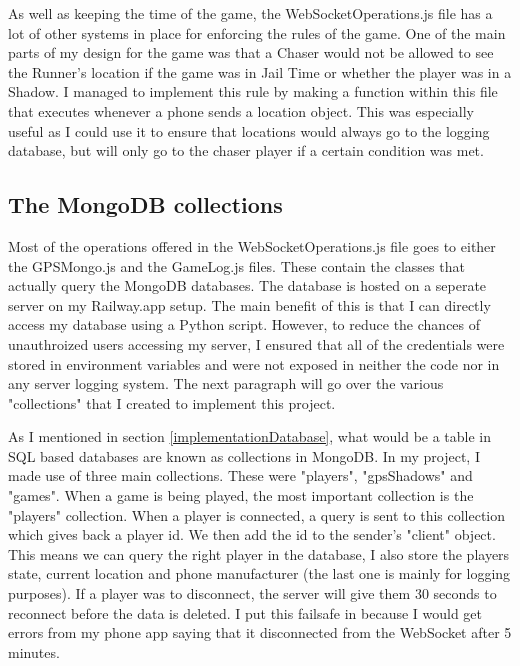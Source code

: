 \documentclass{l4proj}
\begin{document}
As well as keeping the time of the game, the WebSocketOperations.js file has a lot of other systems in place for enforcing the
rules of the game. One of the main parts of my design for the game was that a Chaser would not be allowed to see the Runner's
location if the game was in Jail Time or whether the player was in a Shadow. I managed to implement this rule by making
a function within this file that executes whenever a phone sends a location object. This was especially useful as I could
use it to ensure that locations would always go to the logging database, but will only go to the chaser player if a certain
condition was met.

\subsection{The MongoDB collections}
\label{mongocollections}
Most of the operations offered in the WebSocketOperations.js file goes to either the GPSMongo.js and the GameLog.js
files. These contain the classes that actually query the MongoDB databases. The database is hosted on a seperate
server on my Railway.app setup. The main benefit of this is that I can directly access my database using a Python
script. However, to reduce the chances of unauthroized users accessing my server, I ensured that all of the credentials
were stored in environment variables and were not exposed in neither the code nor in any server logging system. The
next paragraph will go over the various "collections" that I created to implement this project.

As I mentioned in section \ref{implementationDatabase}, what would be a table in SQL based databases are known as collections in MongoDB.
In my project, I made use of three main collections. These were "players", "gpsShadows" and "games". When a game is being played, the most
important collection is the "players" collection. When a player is connected, a query is sent to this collection which gives back a player id.
We then add the id to the sender's "client" object. This means we can query the right player in the database, I also store the players state,
current location and phone manufacturer (the last one is mainly for logging purposes). If a player was to disconnect, the server will give
them 30 seconds to reconnect before the data is deleted. I put this failsafe in because I would get errors from my phone app saying
that it disconnected from the WebSocket after 5 minutes.
\end{document}
